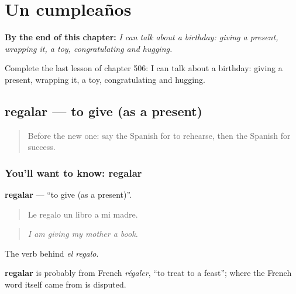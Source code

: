 
\chapter{Un cumpleaños}
\label{ch:es-un-cumpleanos}

\begin{chapteropening}
\textbf{By the end of this chapter:} \emph{I can talk about a birthday: giving a present, wrapping it, a toy, congratulating and hugging.}

Complete the last lesson of chapter 506: I can talk about a birthday: giving a present, wrapping it, a toy, congratulating and hugging.
\end{chapteropening}

\section[regalar]{regalar — to give (as a present)}

\label{lesson:ES-C506-regalar}



\begin{quote}
Before the new one: say the Spanish for to rehearse, then the Spanish for success.
\end{quote}

\subsection*{You'll want to know: regalar}
\textbf{regalar} — \textquotedblleft{}to give (as a present)\textquotedblright{}.

\begin{quote}
Le regalo un libro a mi madre.
\end{quote}

\begin{quote}
\emph{I am giving my mother a book.}
\end{quote}

The verb behind \emph{el regalo}.

\begin{cousinweb}
\textbf{regalar} is probably from French \emph{régaler}, \textquotedblleft{}to treat to a feast\textquotedblright{}; where the French word itself came from is disputed.
\end{cousinweb}

